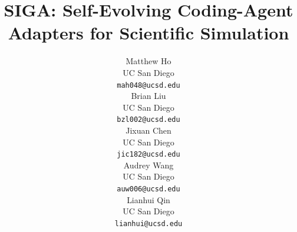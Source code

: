 \documentclass{article}
\title{SIGA: Self-Evolving Coding-Agent Adapters for Scientific Simulation}
\author{%
  Matthew Ho \\
  UC San Diego \\
  \texttt{mah048@ucsd.edu} \\
  \And
  Brian Liu \\
  UC San Diego \\
  \texttt{bzl002@ucsd.edu} \\
  \And
  Jixuan Chen \\
  UC San Diego \\
  \texttt{jic182@ucsd.edu} \\
  \And
  Audrey Wang \\
  UC San Diego \\
  \texttt{auw006@ucsd.edu} \\
  \And
  Lianhui Qin \\
  UC San Diego \\
  \texttt{lianhui@ucsd.edu} \\
}
\begin{document}
\maketitle


\begin{abstract}


\end{abstract}
\end{document}
